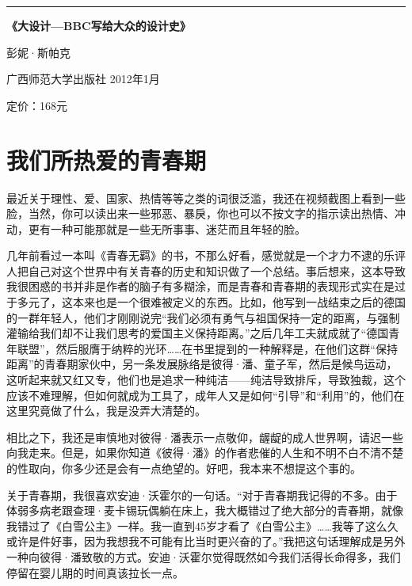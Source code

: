 \begin{center}\rule{3in}{0.4pt}\end{center}

\textbf{《大设计---BBC写给大众的设计史》}

彭妮·斯帕克

广西师范大学出版社 2012年1月

定价：168元

\section{我们所热爱的青春期}

最近关于理性、爱、国家、热情等等之类的词很泛滥，我还在视频截图上看到一些脸，当然，你可以读出来一些邪恶、暴戾，你也可以不按文字的指示读出热情、冲动，更有一种可能那就是一些无所事事、迷茫而且年轻的脸。

几年前看过一本叫《青春无羁》的书，不那么好看，感觉就是一个才力不逮的乐评人把自己对这个世界中有关青春的历史和知识做了一个总结。事后想来，这本导致我很困惑的书并非是作者的脑子有多糊涂，而是青春和青春期的表现形式实在是过于多元了，这本来也是一个很难被定义的东西。比如，他写到一战结束之后的德国的一群年轻人，他们才刚刚说完``我们必须有勇气与祖国保持一定的距离，与强制灌输给我们却不让我们思考的爱国主义保持距离。''之后几年工夫就成就了``德国青年联盟''，然后服膺于纳粹的光环\ldots{}\ldots{}在书里提到的一种解释是，在他们这群``保持距离''的青春期家伙中，另一条发展脉络是彼得·潘、童子军，然后是候鸟运动，这听起来就又红又专，他们也是追求一种纯洁------纯洁导致排斥，导致独裁，这个应该不难理解，但如何就成为工具了，成年人又是如何``引导''和``利用''的，他们在这里究竟做了什么，我是没弄大清楚的。

相比之下，我还是审慎地对彼得·潘表示一点敬仰，龌龊的成人世界啊，请迟一些向我走来。但是，如果你知道《彼得·潘》的作者悲催的人生和不明不白不清不楚的性取向，你多少还是会有一点绝望的。好吧，我本来不想提这个事的。

关于青春期，我很喜欢安迪·沃霍尔的一句话。``对于青春期我记得的不多。由于体弱多病老跟查理·麦卡锡玩偶躺在床上，我大概错过了绝大部分的青春期，就像我错过了《白雪公主》一样。我一直到45岁才看了《白雪公主》\ldots{}\ldots{}我等了这么久或许是件好事，因为我想我不可能有比当时更兴奋的了。''我把这句话理解成是另外一种向彼得·潘致敬的方式。安迪·沃霍尔觉得既然如今我们活得长命得多，我们停留在婴儿期的时间真该拉长一点。

